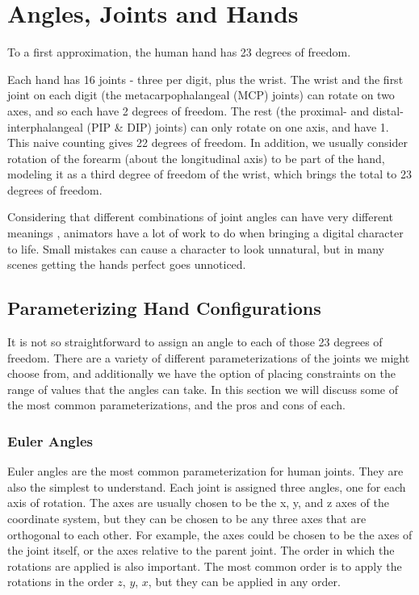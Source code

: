 \chapter{Angles, Joints and Hands}
\label{C:angles-joints-hands}

To a first approximation, the human hand has 23 degrees of freedom.

Each hand has 16 joints - three per digit, plus the wrist. The wrist and the first joint on each digit (the metacarpophalangeal (MCP) joints) can rotate on two axes, and so each have 2 degrees of freedom. The rest (the proximal- and distal-interphalangeal (PIP \& DIP) joints) can only rotate on one axis, and have 1. This naive counting gives 22 degrees of freedom. In addition, we usually consider rotation of the forearm (about the longitudinal axis) to be part of the hand, modeling it as a third degree of freedom of the wrist, which brings the total to 23 degrees of freedom.

Considering that different combinations of joint angles can have very {\Symbola\Large\Large{}} different {\Symbola\Large\Large{}} meanings {\Symbola\Large\Large{}}, animators have a lot of work to do when bringing a digital character to life. Small mistakes can cause a character to look unnatural, but in many scenes getting the hands perfect goes unnoticed.

\section{Parameterizing Hand Configurations}

It is not so straightforward to assign an angle to each of those 23 degrees of freedom. There are a variety of different parameterizations of the joints we might choose from, and additionally we have the option of placing constraints on the range of values that the angles can take. In this section we will discuss some of the most common parameterizations, and the pros and cons of each.

\subsection{Euler Angles}

Euler angles are the most common parameterization for human joints. They are also the simplest to understand. Each joint is assigned three angles, one for each axis of rotation. The axes are usually chosen to be the x, y, and z axes of the coordinate system, but they can be chosen to be any three axes that are orthogonal to each other.  For example, the axes could be chosen to be the axes of the joint itself, or the axes relative to the parent joint. The order in which the rotations are applied is also important. The most common order is to apply the rotations in the order $z$, $y$, $x$, but they can be applied in any order.

